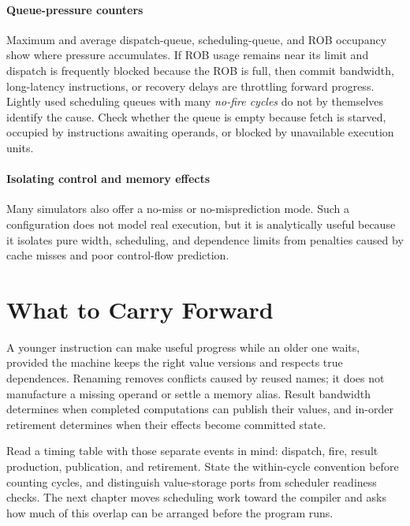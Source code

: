 \paragraph{Queue-pressure counters}\label{par:ilp-queue-pressure}
Maximum and average dispatch-queue, scheduling-queue, and ROB occupancy show where pressure accumulates.
If ROB usage remains near its limit and dispatch is frequently blocked because the ROB is full, then commit bandwidth, long-latency instructions, or recovery delays are throttling forward progress.
Lightly used scheduling queues with many \textit{no-fire cycles} do not by themselves identify the cause.
Check whether the queue is empty because fetch is starved, occupied by instructions awaiting operands, or blocked by unavailable execution units.

\paragraph{Isolating control and memory effects}\label{par:ilp-isolate-effects}
Many simulators also offer a no-miss or no-misprediction mode.
Such a configuration does not model real execution, but it is analytically useful because it isolates pure width, scheduling, and dependence limits from penalties caused by cache misses and poor control-flow prediction.


\section{What to Carry Forward}\label{sec:chapter6-summary-ilp}
A younger instruction can make useful progress while an older one waits, provided the machine keeps the right value versions and respects true dependences.
Renaming removes conflicts caused by reused names; it does not manufacture a missing operand or settle a memory alias.
Result bandwidth determines when completed computations can publish their values, and in-order retirement determines when their effects become committed state.

Read a timing table with those separate events in mind: dispatch, fire, result production, publication, and retirement.
State the within-cycle convention before counting cycles, and distinguish value-storage ports from scheduler readiness checks.
The next chapter moves scheduling work toward the compiler and asks how much of this overlap can be arranged before the program runs.


